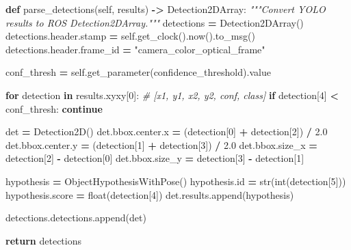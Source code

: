 \documentclass[
]{article}
\newenvironment{Shaded}{\begin{snugshade}}{\end{snugshade}}
\newcommand{\BuiltInTok}[1]{#1}
\newcommand{\CommentTok}[1]{\textcolor[rgb]{0.56,0.35,0.01}{\textit{#1}}}
\newcommand{\ControlFlowTok}[1]{\textcolor[rgb]{0.13,0.29,0.53}{\textbf{#1}}}
\newcommand{\DecValTok}[1]{\textcolor[rgb]{0.00,0.00,0.81}{#1}}
\newcommand{\FloatTok}[1]{\textcolor[rgb]{0.00,0.00,0.81}{#1}}
\newcommand{\KeywordTok}[1]{\textcolor[rgb]{0.13,0.29,0.53}{\textbf{#1}}}
\newcommand{\NormalTok}[1]{#1}
\newcommand{\OperatorTok}[1]{\textcolor[rgb]{0.81,0.36,0.00}{\textbf{#1}}}
\newcommand{\StringTok}[1]{\textcolor[rgb]{0.31,0.60,0.02}{#1}}
\newcommand{\VariableTok}[1]{\textcolor[rgb]{0.00,0.00,0.00}{#1}}
\begin{document}
\begin{Shaded}
\begin{Highlighting}[]
    \KeywordTok{def}\NormalTok{ parse\_detections(}\VariableTok{self}\NormalTok{, results) }\OperatorTok{{-}\textgreater{}}\NormalTok{ Detection2DArray:}
        \CommentTok{"""Convert YOLO results to ROS Detection2DArray."""}
\NormalTok{        detections }\OperatorTok{=}\NormalTok{ Detection2DArray()}
\NormalTok{        detections.header.stamp }\OperatorTok{=} \VariableTok{self}\NormalTok{.get\_clock().now().to\_msg()}
\NormalTok{        detections.header.frame\_id }\OperatorTok{=} \StringTok{"camera\_color\_optical\_frame"}

\NormalTok{        conf\_thresh }\OperatorTok{=} \VariableTok{self}\NormalTok{.get\_parameter(}\StringTok{\textquotesingle{}confidence\_threshold\textquotesingle{}}\NormalTok{).value}

        \ControlFlowTok{for}\NormalTok{ detection }\KeywordTok{in}\NormalTok{ results.xyxy[}\DecValTok{0}\NormalTok{]:  }\CommentTok{\# [x1, y1, x2, y2, conf, class]}
            \ControlFlowTok{if}\NormalTok{ detection[}\DecValTok{4}\NormalTok{] }\OperatorTok{\textless{}}\NormalTok{ conf\_thresh:}
                \ControlFlowTok{continue}

\NormalTok{            det }\OperatorTok{=}\NormalTok{ Detection2D()}
\NormalTok{            det.bbox.center.x }\OperatorTok{=}\NormalTok{ (detection[}\DecValTok{0}\NormalTok{] }\OperatorTok{+}\NormalTok{ detection[}\DecValTok{2}\NormalTok{]) }\OperatorTok{/} \FloatTok{2.0}
\NormalTok{            det.bbox.center.y }\OperatorTok{=}\NormalTok{ (detection[}\DecValTok{1}\NormalTok{] }\OperatorTok{+}\NormalTok{ detection[}\DecValTok{3}\NormalTok{]) }\OperatorTok{/} \FloatTok{2.0}
\NormalTok{            det.bbox.size\_x }\OperatorTok{=}\NormalTok{ detection[}\DecValTok{2}\NormalTok{] }\OperatorTok{{-}}\NormalTok{ detection[}\DecValTok{0}\NormalTok{]}
\NormalTok{            det.bbox.size\_y }\OperatorTok{=}\NormalTok{ detection[}\DecValTok{3}\NormalTok{] }\OperatorTok{{-}}\NormalTok{ detection[}\DecValTok{1}\NormalTok{]}

\NormalTok{            hypothesis }\OperatorTok{=}\NormalTok{ ObjectHypothesisWithPose()}
\NormalTok{            hypothesis.}\BuiltInTok{id} \OperatorTok{=} \BuiltInTok{str}\NormalTok{(}\BuiltInTok{int}\NormalTok{(detection[}\DecValTok{5}\NormalTok{]))}
\NormalTok{            hypothesis.score }\OperatorTok{=} \BuiltInTok{float}\NormalTok{(detection[}\DecValTok{4}\NormalTok{])}
\NormalTok{            det.results.append(hypothesis)}

\NormalTok{            detections.detections.append(det)}

        \ControlFlowTok{return}\NormalTok{ detections}
\end{Highlighting}
\end{Shaded}
\end{document}
